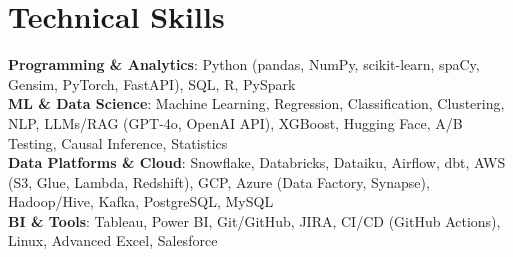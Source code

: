 \documentclass[letterpaper,10pt]{article}
\begin{document}
\section{Technical Skills}
 \begin{itemize}[leftmargin=0.15in, label={}]
    \small{\item{
     \textbf{Programming \& Analytics}{: Python (pandas, NumPy, scikit-learn, spaCy, Gensim, PyTorch, FastAPI), SQL, R, PySpark} \\
     \textbf{ML \& Data Science}{: Machine Learning, Regression, Classification, Clustering, NLP, LLMs/RAG (GPT-4o, OpenAI API), XGBoost, Hugging Face, A/B Testing, Causal Inference, Statistics} \\
     \textbf{Data Platforms \& Cloud}{: Snowflake, Databricks, Dataiku, Airflow, dbt, AWS (S3, Glue, Lambda, Redshift), GCP, Azure (Data Factory, Synapse), Hadoop/Hive, Kafka, PostgreSQL, MySQL} \\
     \textbf{BI \& Tools}{: Tableau, Power BI, Git/GitHub, JIRA, CI/CD (GitHub Actions), Linux, Advanced Excel, Salesforce}
    }}
 \end{itemize}
\end{document}
